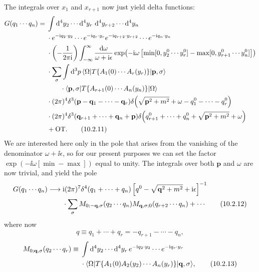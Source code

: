 The integrals over $x_1$ and $x_{r+1}$ now just yield delta functions:
\begin{align}
  G(q_1\cdots q_n)={}&
  \int \dd^4y_2\cdots \dd^4y_r\,\dd^4y_{r+2}\cdots \dd^4y_n
  \notag\\
  &\cdot e^{-\ii q_2\cdot y_2}\cdots e^{-\ii q_r\cdot y_r}
  e^{-\ii q_{r+2}\cdot y_{r+2}}\cdots e^{-\ii q_n\cdot y_n}
  \notag\\
  &\cdot\left(-\frac{1}{2\pi \ii}\right)
  \int_{-\infty}^{\infty}\frac{\dd\omega}{\omega+\ii\epsilon}
  \exp\!\left(-\ii\omega\left[
  \min[0,y_2^0\cdots y_r^0]-\max[0,y_{r+1}^0\cdots y_n^0]
  \right]\right)
  \notag\\
  &\cdot\sum_\sigma\int \dd^3p\,
  \bra{\Omega}T\{A_1(0)\cdots A_r(y_r)\}\ket{\mathbf p,\sigma}
  \notag\\
  &\qquad\cdot\bra{\mathbf p,\sigma}T\{A_{r+1}(0)\cdots A_n(y_n)\}\ket{\Omega}
  \notag\\
  &\cdot(2\pi)^4\delta^3(\mathbf p-\mathbf q_1-\cdots-\mathbf q_r)
  \delta\!\left(\sqrt{\mathbf p^2+m^2}+\omega-q_1^0-\cdots-q_r^0\right)
  \notag\\
  &\cdot(2\pi)^4\delta^3(\mathbf q_{r+1}+\cdots+\mathbf q_n+\mathbf p)
  \delta\!\left(q_{r+1}^0+\cdots+q_n^0+\sqrt{\mathbf p^2+m^2}+\omega\right)
  \notag\\
  &+\mathrm{OT}.
  \tag{10.2.11}\label{eq:10.2.11}
\end{align}
We are interested here only in the pole that arises from the vanishing of
the denominator $\omega+\ii\epsilon$, so for our present purposes we can set the factor
$\exp(-\ii\omega[\min-\max])$ equal to unity. The integrals over both $\mathbf p$ and $\omega$ are
now trivial, and yield the pole
\begin{align}
  G(q_1\cdots q_n)\longrightarrow{}&
  \mathrm{i}(2\pi)^7\delta^4(q_1+\cdots+q_n)
  \left[q^0-\sqrt{\mathbf q^2+m^2}+\mathrm{i}\epsilon\right]^{-1}
  \notag\\
  &\cdot\sum_\sigma
  M_{0;-\mathbf q,\sigma}(q_2\cdots q_n)
  M_{\mathbf q,\sigma;0}(q_{r+2}\cdots q_n)+\cdots
  \tag{10.2.12}\label{eq:10.2.12}
\end{align}
where now
\[
  q\equiv q_1+\cdots+q_r=-q_{r+1}-\cdots-q_n,
\]
\begin{align}
  M_{0;\mathbf q,\sigma}(q_2\cdots q_r)
  \equiv{}&\int \mathop{}\!\mathrm{d}^4y_2\cdots \mathop{}\!\mathrm{d}^4y_r\,
  e^{-\mathrm{i} q_2\cdot y_2}\cdots e^{-\mathrm{i} q_r\cdot y_r}
  \notag\\
  &\cdot\langle \Omega\rvert T\{A_1(0)A_2(y_2)\cdots A_n(y_r)\}\lvert \mathbf q,\sigma\rangle,
  \tag{10.2.13}\label{eq:10.2.13}
\end{align}
